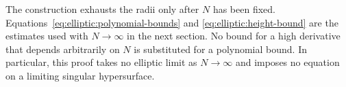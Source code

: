 \begin{remark}\label{rem:elliptic:limit-order}
The construction exhausts the radii only after $N$ has been fixed.
Equations~\eqref{eq:elliptic:polynomial-bounds} and
\eqref{eq:elliptic:height-bound} are the estimates used with $N\to\infty$
in the next section.  No bound for a high derivative that depends
arbitrarily on $N$ is substituted for a polynomial bound.  In
particular, this proof takes no elliptic limit as $N\to\infty$ and
imposes no equation on a limiting singular hypersurface.
\end{remark}
